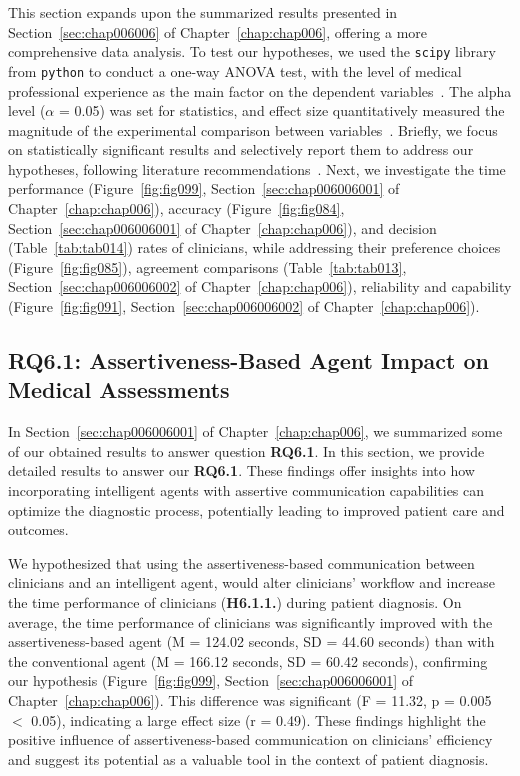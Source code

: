 This section expands upon the summarized results presented in Section~\ref{sec:chap006006} of Chapter~\ref{chap:chap006}, offering a more comprehensive data analysis.
To test our hypotheses, we used the \texttt{scipy} library from \texttt{python} to conduct a one-way \ac{ANOVA} test, with the level of medical professional experience as the main factor on the dependent variables~\cite{CASALE2022107302}.
\textcolor{revised}{The alpha level ($\alpha$ = 0.05) was set for statistics, and effect size quantitatively measured the magnitude of the experimental comparison between variables~\cite{Yigit_Mendes_2018, 10.1145/3180155.3182556}.
Briefly, we focus on statistically significant results and selectively report them to address our hypotheses, following literature recommendations~\cite{10.1145/3301275.3302289, 10.1145/3290605.3300234, 10.1145/3491102.3517791}.}
Next, we investigate the time performance (Figure~\ref{fig:fig099}, Section~\ref{sec:chap006006001} of Chapter~\ref{chap:chap006}), accuracy (Figure~\ref{fig:fig084}, Section~\ref{sec:chap006006001} of Chapter~\ref{chap:chap006}), and decision (Table~\ref{tab:tab014}) rates of clinicians, while addressing their preference choices (Figure~\ref{fig:fig085}), agreement comparisons (Table~\ref{tab:tab013}, Section~\ref{sec:chap006006002} of Chapter~\ref{chap:chap006}), reliability and capability (Figure~\ref{fig:fig091}, Section~\ref{sec:chap006006002} of Chapter~\ref{chap:chap006}).

\subsection{RQ6.1: Assertiveness-Based Agent Impact on Medical Assessments}
\label{sec:app005007001}

In Section~\ref{sec:chap006006001} of Chapter~\ref{chap:chap006}, we summarized some of our obtained results to answer question {\bf RQ6.1}.
In this section, we provide detailed results to answer our {\bf RQ6.1}.
These findings offer insights into how incorporating intelligent agents with assertive communication capabilities can optimize the diagnostic process, potentially leading to improved patient care and outcomes.

We hypothesized that using the assertiveness-based communication between clinicians and an intelligent agent, would alter clinicians' workflow and increase the time performance of clinicians ({\bf H6.1.1.}) during patient diagnosis.
On average, the time performance of clinicians was significantly improved with the assertiveness-based agent (M = 124.02 seconds, SD = 44.60 seconds) than with the conventional agent (M = 166.12 seconds, SD = 60.42 seconds), confirming our hypothesis (Figure~\ref{fig:fig099}, Section~\ref{sec:chap006006001} of Chapter~\ref{chap:chap006}).
This difference was significant (F = 11.32, p = 0.005 $<$ 0.05), indicating a large effect size (r = 0.49).
These findings highlight the positive influence of assertiveness-based communication on clinicians' efficiency and suggest its potential as a valuable tool in the context of patient diagnosis.


